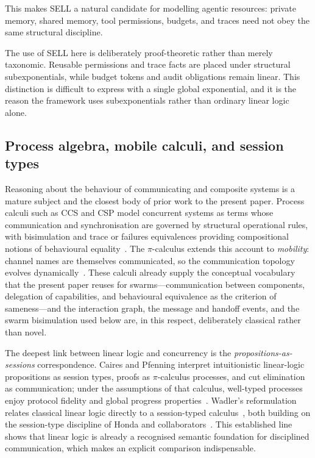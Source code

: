 \documentclass[a4paper,fleqn]{cas-sc}
\begin{document}
This makes SELL a natural candidate for modelling agentic resources: private memory, shared memory, tool permissions, budgets, and traces need not obey the same structural discipline.

The use of SELL here is deliberately proof-theoretic rather than merely taxonomic. Reusable permissions and trace facts are placed under structural subexponentials, while budget tokens and audit obligations remain linear. This distinction is difficult to express with a single global exponential, and it is the reason the framework uses subexponentials rather than ordinary linear logic alone.

\subsection{Process algebra, mobile calculi, and session types}

Reasoning about the behaviour of communicating and composite systems is a mature subject and the closest body of prior work to the present paper. Process calculi such as CCS and CSP model concurrent systems as terms whose communication and synchronisation are governed by structural operational rules, with bisimulation and trace or failures equivalences providing compositional notions of behavioural equality~\cite{milner1989,hoare1978csp,hennessy1985}. The \(\pi\)-calculus extends this account to \emph{mobility}: channel names are themselves communicated, so the communication topology evolves dynamically~\cite{milner1992picalculus,sangiorgi2011}. These calculi already supply the conceptual vocabulary that the present paper reuses for swarms---communication between components, delegation of capabilities, and behavioural equivalence as the criterion of sameness---and the interaction graph, the message and handoff events, and the swarm bisimulation used below are, in this respect, deliberately classical rather than novel.

The deepest link between linear logic and concurrency is the \emph{propositions-as-sessions} correspondence. Caires and Pfenning interpret intuitionistic linear-logic propositions as session types, proofs as \(\pi\)-calculus processes, and cut elimination as communication; under the assumptions of that calculus, well-typed processes enjoy protocol fidelity and global progress properties~\cite{caires2010sessions}. Wadler's reformulation relates classical linear logic directly to a session-typed calculus~\cite{wadler2014sessions}, both building on the session-type discipline of Honda and collaborators~\cite{honda1998,huttel2016}. This established line shows that linear logic is already a recognised semantic foundation for disciplined communication, which makes an explicit comparison indispensable.
\end{document}
